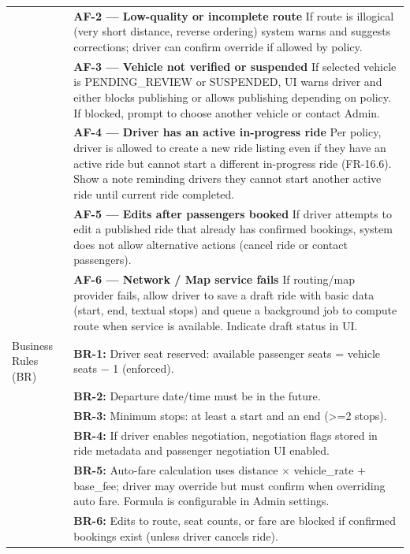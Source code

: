\begin{longtable}{|>{\raggedright\arraybackslash}p{4cm}|>{\raggedright\arraybackslash}p{11cm}|}
& \textbf{AF-2 — Low-quality or incomplete route} \newline If route is illogical (very short distance, reverse ordering) system warns and suggests corrections; driver can confirm override if allowed by policy. \\
& \textbf{AF-3 — Vehicle not verified or suspended} \newline If selected vehicle is PENDING\_REVIEW or SUSPENDED, UI warns driver and either blocks publishing or allows publishing depending on policy. If blocked, prompt to choose another vehicle or contact Admin. \\
& \textbf{AF-4 — Driver has an active in-progress ride} \newline Per policy, driver is allowed to create a new ride listing even if they have an active ride but cannot start a different in-progress ride (FR-16.6). Show a note reminding drivers they cannot start another active ride until current ride completed. \\
& \textbf{AF-5 — Edits after passengers booked} \newline If driver attempts to edit a published ride that already has confirmed bookings, system does not allow alternative actions (cancel ride or contact passengers). \\
& \textbf{AF-6 — Network / Map service fails} \newline If routing/map provider fails, allow driver to save a draft ride with basic data (start, end, textual stops) and queue a background job to compute route when service is available. Indicate draft status in UI. \\
\hline
Business Rules (BR) & \textbf{BR-1:} Driver seat reserved: available passenger seats = vehicle seats − 1 (enforced). \\
& \textbf{BR-2:} Departure date/time must be in the future. \\
& \textbf{BR-3:} Minimum stops: at least a start and an end (>=2 stops). \\
& \textbf{BR-4:} If driver enables negotiation, negotiation flags stored in ride metadata and passenger negotiation UI enabled. \\
& \textbf{BR-5:} Auto-fare calculation uses distance $\times$ vehicle\_rate + base\_fee; driver may override but must confirm when overriding auto fare. Formula is configurable in Admin settings. \\
& \textbf{BR-6:} Edits to route, seat counts, or fare are blocked if confirmed bookings exist (unless driver cancels ride). \\

\end{longtable}
